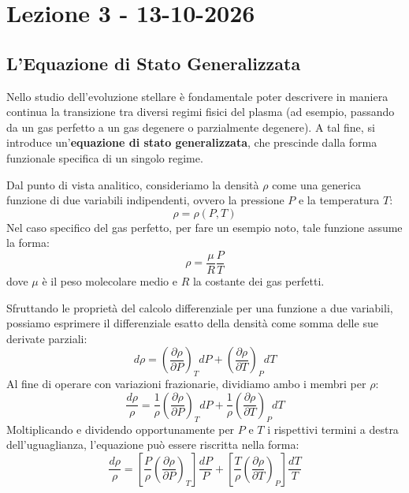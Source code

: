 \chapter{Lezione 3 - 13-10-2026}

\section{L'Equazione di Stato Generalizzata}

Nello studio dell'evoluzione stellare è fondamentale poter descrivere in maniera continua la transizione tra diversi regimi fisici del plasma (ad esempio, passando da un gas perfetto a un gas degenere o parzialmente degenere). A tal fine, si introduce un'\textbf{equazione di stato generalizzata}, che prescinde dalla forma funzionale specifica di un singolo regime.

Dal punto di vista analitico, consideriamo la densità $\rho$ come una generica funzione di due variabili indipendenti, ovvero la pressione $P$ e la temperatura $T$:
\begin{equation}
\rho = \rho(P, T)
\end{equation}
Nel caso specifico del gas perfetto, per fare un esempio noto, tale funzione assume la forma:
\begin{equation}
\rho = \frac{\mu}{R} \frac{P}{T}
\end{equation}
dove $\mu$ è il peso molecolare medio e $R$ la costante dei gas perfetti.

Sfruttando le proprietà del calcolo differenziale per una funzione a due variabili, possiamo esprimere il differenziale esatto della densità come somma delle sue derivate parziali:
\begin{equation}
d\rho = \left(\frac{\partial \rho}{\partial P}\right)_T dP + \left(\frac{\partial \rho}{\partial T}\right)_P dT
\end{equation}
Al fine di operare con variazioni frazionarie, dividiamo ambo i membri per $\rho$:
\begin{equation}
\frac{d\rho}{\rho} = \frac{1}{\rho} \left(\frac{\partial \rho}{\partial P}\right)_T dP + \frac{1}{\rho} \left(\frac{\partial \rho}{\partial T}\right)_P dT
\end{equation}
Moltiplicando e dividendo opportunamente per $P$ e $T$ i rispettivi termini a destra dell'uguaglianza, l'equazione può essere riscritta nella forma:
\begin{equation}
\frac{d\rho}{\rho} = \left[ \frac{P}{\rho} \left(\frac{\partial \rho}{\partial P}\right)_T \right] \frac{dP}{P} + \left[ \frac{T}{\rho} \left(\frac{\partial \rho}{\partial T}\right)_P \right] \frac{dT}{T}
\end{equation}

